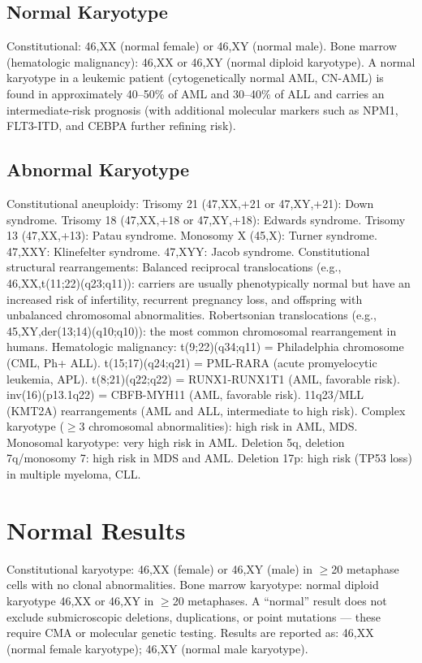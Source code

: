 \subsection*{Normal Karyotype}
Constitutional: 46,XX (normal female) or 46,XY (normal male). Bone marrow (hematologic malignancy): 46,XX or 46,XY (normal diploid karyotype). A normal karyotype in a leukemic patient (cytogenetically normal AML, CN-AML) is found in approximately 40--50\% of AML and 30--40\% of ALL and carries an intermediate-risk prognosis (with additional molecular markers such as NPM1, FLT3-ITD, and CEBPA further refining risk).

\subsection*{Abnormal Karyotype}
Constitutional aneuploidy: Trisomy 21 (47,XX,+21 or 47,XY,+21): Down syndrome. Trisomy 18 (47,XX,+18 or 47,XY,+18): Edwards syndrome. Trisomy 13 (47,XX,+13): Patau syndrome. Monosomy X (45,X): Turner syndrome. 47,XXY: Klinefelter syndrome. 47,XYY: Jacob syndrome. Constitutional structural rearrangements: Balanced reciprocal translocations (e.g., 46,XX,t(11;22)(q23;q11)): carriers are usually phenotypically normal but have an increased risk of infertility, recurrent pregnancy loss, and offspring with unbalanced chromosomal abnormalities. Robertsonian translocations (e.g., 45,XY,der(13;14)(q10;q10)): the most common chromosomal rearrangement in humans. Hematologic malignancy: t(9;22)(q34;q11) = Philadelphia chromosome (CML, Ph+ ALL). t(15;17)(q24;q21) = PML-RARA (acute promyelocytic leukemia, APL). t(8;21)(q22;q22) = RUNX1-RUNX1T1 (AML, favorable risk). inv(16)(p13.1q22) = CBFB-MYH11 (AML, favorable risk). 11q23/MLL (KMT2A) rearrangements (AML and ALL, intermediate to high risk). Complex karyotype ($\geq$3 chromosomal abnormalities): high risk in AML, MDS. Monosomal karyotype: very high risk in AML. Deletion 5q, deletion 7q/monosomy 7: high risk in MDS and AML. Deletion 17p: high risk (TP53 loss) in multiple myeloma, CLL.

\section*{Normal Results}
Constitutional karyotype: 46,XX (female) or 46,XY (male) in $\geq$20 metaphase cells with no clonal abnormalities. Bone marrow karyotype: normal diploid karyotype 46,XX or 46,XY in $\geq$20 metaphases. A ``normal'' result does not exclude submicroscopic deletions, duplications, or point mutations --- these require CMA or molecular genetic testing. Results are reported as: 46,XX (normal female karyotype); 46,XY (normal male karyotype).

